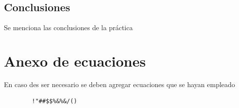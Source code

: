 \documentclass[letterpaper,12pt]{extarticle}%
\begin{document}
	\begin{multicols}{2}
	    
	    \section{Conclusiones}

Se menciona las conclusiones de la práctica	    
%            
    \end{multicols}
    
	\newpage
	
	\section{Anexo de ecuaciones}
	
	En caso des ser necesario se deben agregar ecuaciones que se hayan empleado

	\begin{verbatim}
		!"##$$%&%&/()
	\end{verbatim}

	\cfoot{\LaTeX}
\end{document}
